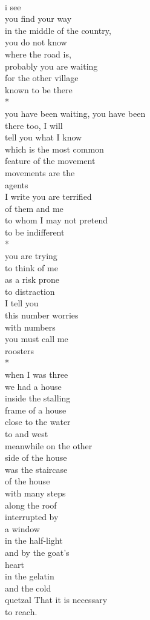 \documentclass[smalldemyvopaper,11pt,twoside,onecolumn,openright,extrafontsizes]{memoir}
\begin{document}
\\i see
\\you find your way
\\in the middle of the country,
\\you do not know
\\where the road is,
\\probably you are waiting
\\for the other village
\\known to be there
\\*
\\you have been waiting, you have been
\\there too, I will
\\tell you what I know
\\which is the most common
\\feature of the movement
\\movements are the
\\agents
\\I write you are terrified
\\of them and me
\\to whom I may not pretend
\\to be indifferent
\\*
\\you are trying
\\to think of me
\\as a risk prone
\\to distraction
\\I tell you
\\this number worries
\\with numbers
\\you must call me
\\roosters
\\*
\\when I was three
\\we had a house
\\inside the stalling
\\frame of a house
\\close to the water
\\to and west
\\meanwhile on the other
\\side of the house
\\was the staircase
\\of the house
\\with many steps
\\along the roof
\\interrupted by
\\a window
\\in the half-light
\\and by the goat's
\\heart
\\in the gelatin
\\and the cold
\\quetzal That it is necessary
\\to reach.
\end{document}
